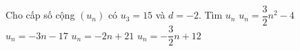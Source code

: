 \begin{ex}%
	 Cho cấp số cộng $({{u}_{n}})$ có ${{u}_{3}}=15$ và $d=-2$. Tìm ${{u}_{n}}$
	 \choice
		{ ${{u}_{n}}=\dfrac{3}{2}{{n}^2}-4$} 
		{ ${{u}_{n}}=-3n-17$} 
		{ \True  ${{u}_{n}}=-2n+21$}
		{  ${{u}_{n}}=-\dfrac{3}{2}n+12$}
\end{ex}
